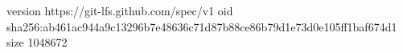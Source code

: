 version https://git-lfs.github.com/spec/v1
oid sha256:ab461ac944a9c13296b7e48636c71d87b88ce86b79d1e73d0e105ff1baf674d1
size 1048672

